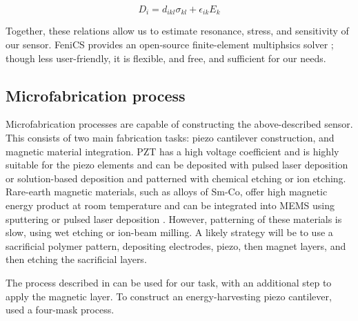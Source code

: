 $$D_i=d_{ikl}\sigma_{kl}+\epsilon_{ik}E_{k}$$
 
Together, these relations allow us to estimate resonance, stress, and sensitivity of our sensor. FeniCS provides an open-source finite-element multiphsics solver \cite{dupont2003fenics}; though less user-friendly, it is flexible, and free, and sufficient for our needs.


\subsection{Microfabrication process}

Microfabrication processes are capable of constructing the above-described sensor. This consists of two main fabrication tasks: piezo cantilever construction, and magnetic material integration. PZT has a high voltage coefficient and is highly suitable for the piezo elements \cite{tadigadapa2009piezoelectric} and can be deposited with pulsed laser deposition or solution-based deposition and patterned with chemical etching or ion etching. Rare-earth magnetic materials, such as alloys of Sm-Co, offer high magnetic energy product at room temperature and can be integrated into MEMS using sputtering or pulsed laser deposition \cite{arnold2009permanent}. However, patterning of these materials is slow, using wet etching or ion-beam milling. A likely strategy will be to use a sacrificial polymer pattern, depositing electrodes, piezo, then magnet layers, and then etching the sacrificial layers. 

The process described in \cite{shen2008design} can be used for our task, with an additional step to apply the magnetic layer. To construct an energy-harvesting piezo cantilever, \cite{shen2008design} used a four-mask process.


